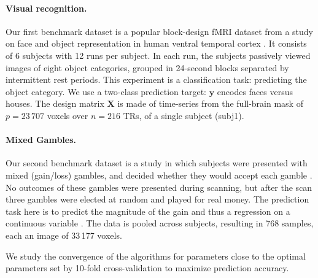\paragraph{Visual recognition.}
\label{subsec:haxby}
Our first benchmark dataset is a popular block-design fMRI dataset from a study on face and
object representation in human ventral temporal cortex  \citep{haxby2001}.
It consists of
6 subjects with 12 runs per subject. In each run, the subjects
passively viewed images of eight object categories, grouped
in 24-second blocks separated by intermittent rest periods. This
experiment is a classification task: predicting the object category. We use a
two-class prediction target: $\mathbf{y}$ encodes faces versus houses.
The design matrix $\mathbf{X}$ is made of
time-series from the full-brain mask of $p = 23\,707$ voxels over $n =
216$ TRs, of a single subject (subj1).

\paragraph{Mixed Gambles.}
Our second benchmark dataset is a study in which
subjects were presented with mixed (gain/loss) gambles, and decided
whether they would accept each gamble \citep{mixedgambles2007}.  No outcomes of these gambles
were presented during scanning, but after the scan three gambles were
elected at random and played for real money. The prediction task here is
to predict the magnitude of the gain and thus a regression on a
continuous variable \citep{jimura2012}. The data is pooled across
subjects, resulting in 768 samples, each an image of 33\,177 voxels.

\smallskip

We study the convergence of the algorithms for parameters close to the
optimal parameters set by 10-fold cross-validation to maximize prediction
accuracy.

